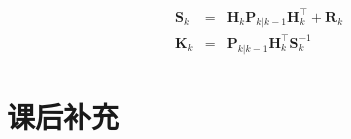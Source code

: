 \begin{eqnarray}
\boldsymbol{S}_{k}&=&{\boldsymbol{H}_{k}}\boldsymbol{P}_{k|k-1}{\boldsymbol{H}_{k}^\top}+\boldsymbol{R}_{k}\\
\boldsymbol{K}_{k}&=&\boldsymbol{P}_{k|k-1}{\boldsymbol{H}_{k}^\top}\boldsymbol{S}_{k}^{-1}
\end{eqnarray}

\section*{课后补充}

\begin{itemize}


\end{itemize}

